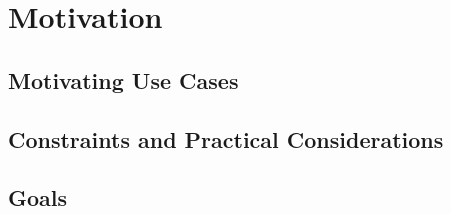 \chapter{Motivation}

\section{Motivating Use Cases}

\section{Constraints and Practical Considerations}

\section{Goals}
